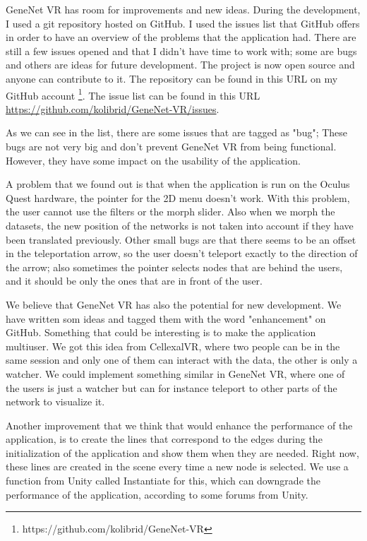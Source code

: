 GeneNet VR has room for improvements and new ideas. During the development, I used a git repository hosted on GitHub. I used the issues list that GitHub offers in order to have an overview of the problems that the application had. There are still a few issues opened and that I didn't have time to work with; some are bugs and others are ideas for future development. The project is now open source and anyone can contribute to it. The repository can be found in this URL on my GitHub account \footnote{https://github.com/kolibrid/GeneNet-VR}. The issue list can be found in this URL \url{https://github.com/kolibrid/GeneNet-VR/issues}.

As we can see in the list, there are some issues that are tagged as "bug"; These bugs are not very big and don't prevent GeneNet VR from being functional. However, they have some impact on the usability of the application.

A problem that we found out is that when the application is run on the Oculus Quest hardware, the pointer for the 2D menu doesn't work. With this problem, the user cannot use the filters or the morph slider. Also when we morph the datasets, the new position of the networks is not taken into account if they have been translated previously. Other small bugs are that there seems to be an offset in the teleportation arrow, so the user doesn't teleport exactly to the direction of the arrow; also sometimes the pointer selects nodes that are behind the users, and it should be only the ones that are in front of the user.

We believe that GeneNet VR has also the potential for new development. We have written som ideas and tagged them with the word "enhancement" on GitHub. Something that could be interesting is to make the application multiuser. We got this idea from CellexalVR\cite{cellexalvr}, where two people can be in the same session and only one of them can interact with the data, the other is only a watcher. We could implement something similar in GeneNet VR, where one of the users is just a watcher but can for instance teleport to other parts of the network to visualize it.

Another improvement that we think that would enhance the performance of the application, is to create the lines that correspond to the edges during the initialization of the application and show them when they are needed. Right now, these lines are created in the scene every time a new node is selected. We use a function from Unity called Instantiate for this, which can downgrade the performance of the application, according to some forums from Unity.

